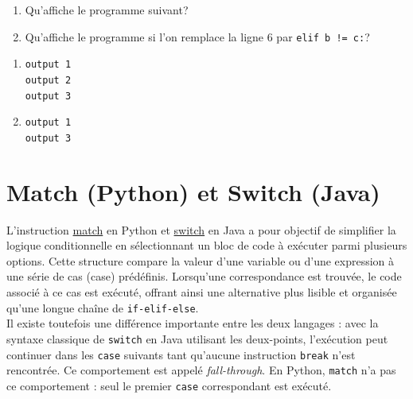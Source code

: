 \begin{Exercice}[5 minutes] 
    \begin{enumerate}
        \item Qu'affiche le programme suivant? 
         
        \item Qu'affiche le programme si l'on remplace la ligne 6 par \verb|elif b != c:|?
    \end{enumerate}

    

    \begin{solution}
        \begin{enumerate}
        \item \texttt{output 1}\\
        \texttt{output 2}\\
        \texttt{output 3}
        \item \texttt{output 1}\\
        \texttt{output 3}
        \end{enumerate}
    \end{solution}
    
\end{Exercice}

\section{Match (Python) et Switch (Java)}
L'instruction \href{https://docs.python.org/fr/3.13/tutorial/controlflow.html#tut-match}{match} en Python et
\href{https://docs.oracle.com/javase/tutorial/java/nutsandbolts/switch.html}{switch} en Java a 
pour objectif de simplifier la logique conditionnelle 
en sélectionnant un bloc de code à exécuter parmi plusieurs 
options. Cette structure compare la valeur d'une variable ou 
d'une expression à une série de cas (case) prédéfinis. 
Lorsqu'une correspondance est trouvée, le code associé à ce 
cas est exécuté, offrant ainsi une alternative plus lisible et 
organisée qu'une longue chaîne de \texttt{if-elif-else}. \\ 

Il existe toutefois une différence importante entre les deux langages : 
avec la syntaxe classique de \texttt{switch} en Java utilisant les deux-points, 
l'exécution peut continuer dans les \texttt{case} suivants tant qu'aucune 
instruction \texttt{break} n'est rencontrée. Ce comportement est appelé 
\textit{fall-through}. En Python, \texttt{match} n'a pas ce comportement : 
seul le premier \texttt{case} correspondant est exécuté. \newline 

